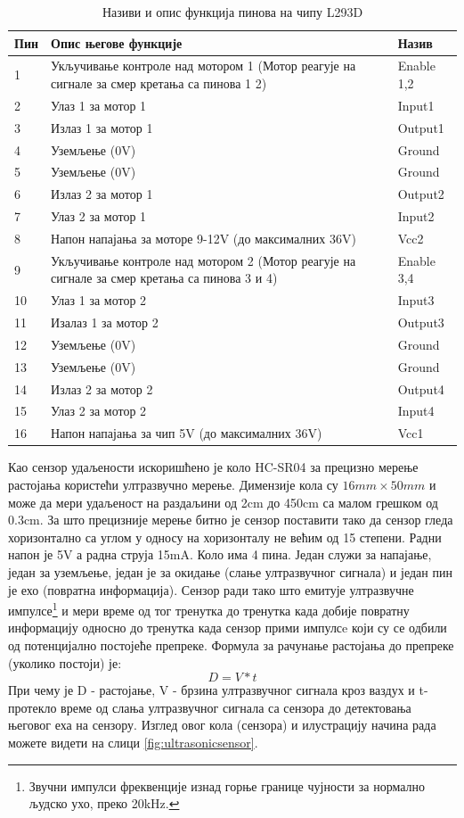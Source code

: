 \documentclass[12pt,oneside]{memoir}
\theoremstyle{remark}
\begin{document}
\begin{table}
\centering
\caption{Називи и опис функција пинова на чипу L293D}
\label{tbl:l293dconfig}
\begin{tabular}{ |p{1cm}||p{10cm}|p{2cm}|}
	\hline
	Пин & Опис његове функције & Назив\\
	\hline
	1 & Укључивање контроле над мотором 1 (Мотор реагује на сигнале за смер кретања са пинова 1  2) & Enable 1,2 \\
	\hline
	2 & Улаз 1 за мотор 1  & Input1 \\
	\hline
	3 & Излаз 1 за мотор 1 & Output1\\
	\hline
	4 & Уземљење (0V) & Ground\\
	\hline
	5 & Уземљење (0V) & Ground\\
	\hline
	6 & Излаз 2 за мотор 1 & Output2\\
	\hline
	7 & Улаз 2 за мотор 1  & Input2 \\
	\hline
	8 & Напон напајања за моторе 9-12V (до максималних 36V) & Vcc2 \\
	\hline
	9 & Укључивање контроле над мотором 2 (Мотор реагује на сигнале за смер кретања са пинова 3 и 4) & Enable 3,4 \\
	\hline
	10 & Улаз 1 за мотор 2 & Input3\\
	\hline
	11 & Изалаз 1 за мотор 2 & Output3\\
	\hline
	12 & Уземљење (0V) & Ground \\
	\hline
	13 & Уземљење (0V)& Ground \\
	\hline
	14 & Излаз 2 за мотор 2 & Output4\\
	\hline
	15 &  Улаз 2 за мотор 2 & Input4 \\
	\hline
	16 & Напон напајања за чип 5V (до максималних 36V) & Vcc1\\
	\hline
\end{tabular}
\end{table}


Као сензор удаљености искоришћено је коло HC-SR04 за прецизно мерење растојања користећи ултразвучно мерење. Димензије кола су $16mm \times 50mm$ и може да мери удаљеност на раздаљини од 2cm до 450cm са малом грешком од 0.3cm. За што прецизније мерење битно је сензор поставити тако да сензор гледа хоризонтално са углом у односу на хоризонталу не већим од 15 степени. Радни напон је 5V а радна струја 15mA. Коло има 4 пина. Један служи за напајање, један за уземљење, један је за окидање (слање ултразвучног сигнала) и један пин је ехо (повратна информација). Сензор ради тако што емитује ултразвучне импулсе\footnote{Звучни импулси фреквенције изнад горње границе чујности за нормално људско ухо, преко 20kHz.}  и мери време од тог тренутка до тренутка када добије повратну информацију односно до тренутка када сензор прими импулсe који су се одбили од потенцијално постојеће препреке. Формула за рачунање растојања до препреке (уколико постоји) је: $$ D = V*t $$
При чему је D - растојање, V - брзина ултразвучног сигнала кроз ваздух и t- протекло време од слања ултразвучног сигнала са сензора до детектовања његовог еха на сензору.
Изглед овог кола (сензора) и илустрацију начина рада можете видети на слици \ref{fig:ultrasonicsensor}. 
\end{document}
